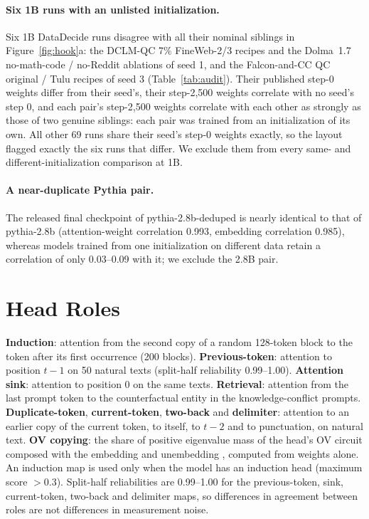 \documentclass[11pt]{article}
\begin{document}
\paragraph{Six 1B runs with an unlisted initialization.}
Six 1B DataDecide runs disagree with all their nominal siblings in Figure~\ref{fig:hook}a: the DCLM-QC 7\% FineWeb-2/3 recipes and the Dolma~1.7 no-math-code / no-Reddit ablations of seed 1, and the Falcon-and-CC QC original / Tulu recipes of seed 3 (Table~\ref{tab:audit}).
Their published step-0 weights differ from their seed's, their step-2{,}500 weights correlate with no seed's step 0, and each pair's step-2{,}500 weights correlate with each other as strongly as those of two genuine siblings: each pair was trained from an initialization of its own.
All other 69 runs share their seed's step-0 weights exactly, so the layout flagged exactly the six runs that differ.
We exclude them from every same- and different-initialization comparison at 1B.

\paragraph{A near-duplicate Pythia pair.}
The released final checkpoint of pythia-2.8b-deduped is nearly identical to that of pythia-2.8b (attention-weight correlation 0.993, embedding correlation 0.985), whereas models trained from one initialization on different data retain a correlation of only 0.03--0.09 with it; we exclude the 2.8B pair.

\section{Head Roles}
\label{app:roles}
\textbf{Induction}: attention from the second copy of a random 128-token block to the token after its first occurrence (200 blocks).
\textbf{Previous-token}: attention to position $t-1$ on 50 natural texts (split-half reliability 0.99--1.00).
\textbf{Attention sink}: attention to position 0 on the same texts.
\textbf{Retrieval}: attention from the last prompt token to the counterfactual entity in the knowledge-conflict prompts.
\textbf{Duplicate-token}, \textbf{current-token}, \textbf{two-back} and \textbf{delimiter}: attention to an earlier copy of the current token, to itself, to $t-2$ and to punctuation, on natural text.
\textbf{OV copying}: the share of positive eigenvalue mass of the head's OV circuit composed with the embedding and unembedding \citep{elhage2021mathematical}, computed from weights alone.
An induction map is used only when the model has an induction head (maximum score $> 0.3$).
Split-half reliabilities are 0.99--1.00 for the previous-token, sink, current-token, two-back and delimiter maps, so differences in agreement between roles are not differences in measurement noise.
\end{document}
